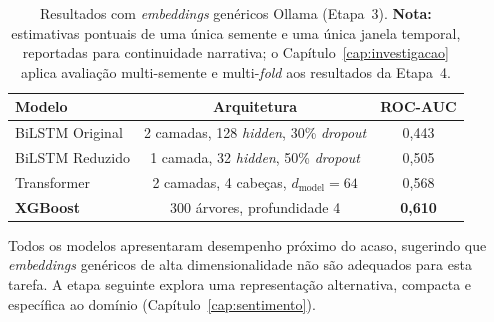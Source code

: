 \begin{table}[htb]
\centering
\caption{Resultados com \textit{embeddings} genéricos Ollama (Etapa~3). \textbf{Nota:} estimativas pontuais de uma única semente e uma única janela temporal, reportadas para continuidade narrativa; o Capítulo~\ref{cap:investigacao} aplica avaliação multi-semente e multi-\textit{fold} aos resultados da Etapa~4.}\label{tab:etapa3}
\begin{tabular}{lcc}
\toprule
\textbf{Modelo} & \textbf{Arquitetura} & \textbf{ROC-AUC} \\
\midrule
BiLSTM Original  & 2 camadas, 128 \textit{hidden}, 30\% \textit{dropout} & 0,443 \\
BiLSTM Reduzido  & 1 camada, 32 \textit{hidden}, 50\% \textit{dropout}  & 0,505 \\
Transformer      & 2 camadas, 4 cabeças, $d_\text{model}=64$              & 0,568 \\
\textbf{XGBoost} & 300 árvores, profundidade 4                            & \textbf{0,610} \\
\bottomrule
\end{tabular}
\end{table}

Todos os modelos apresentaram desempenho próximo do acaso, sugerindo que \textit{embeddings} genéricos de alta dimensionalidade não são adequados para esta tarefa. A etapa seguinte explora uma representação alternativa, compacta e específica ao domínio (Capítulo~\ref{cap:sentimento}).


